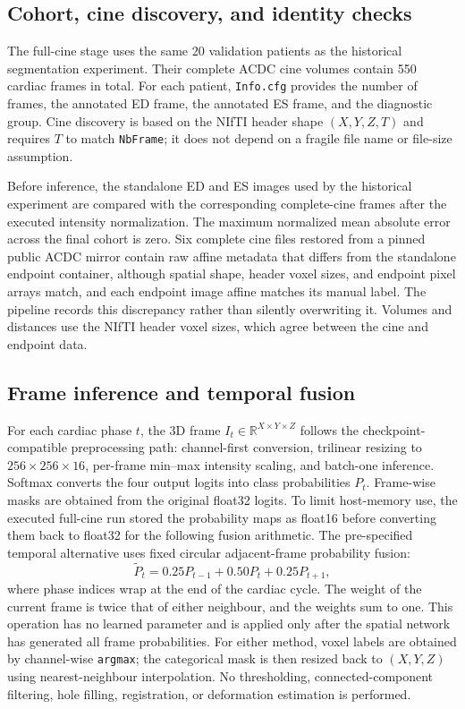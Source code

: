 \subsection{Cohort, cine discovery, and identity checks}
The full-cine stage uses the same 20 validation patients as the historical segmentation experiment. Their complete ACDC cine volumes contain 550 cardiac frames in total. For each patient, \texttt{Info.cfg} provides the number of frames, the annotated ED frame, the annotated ES frame, and the diagnostic group. Cine discovery is based on the NIfTI header shape $(X,Y,Z,T)$ and requires $T$ to match \texttt{NbFrame}; it does not depend on a fragile file name or file-size assumption.

Before inference, the standalone ED and ES images used by the historical experiment are compared with the corresponding complete-cine frames after the executed intensity normalization. The maximum normalized mean absolute error across the final cohort is zero. Six complete cine files restored from a pinned public ACDC mirror contain raw affine metadata that differs from the standalone endpoint container, although spatial shape, header voxel sizes, and endpoint pixel arrays match, and each endpoint image affine matches its manual label. The pipeline records this discrepancy rather than silently overwriting it. Volumes and distances use the NIfTI header voxel sizes, which agree between the cine and endpoint data.

\subsection{Frame inference and temporal fusion}
For each cardiac phase $t$, the 3D frame $I_t\in\mathbb{R}^{X\times Y\times Z}$ follows the checkpoint-compatible preprocessing path: channel-first conversion, trilinear resizing to $256\times256\times16$, per-frame min--max intensity scaling, and batch-one inference. Softmax converts the four output logits into class probabilities $P_t$. Frame-wise masks are obtained from the original float32 logits. To limit host-memory use, the executed full-cine run stored the probability maps as float16 before converting them back to float32 for the following fusion arithmetic. The pre-specified temporal alternative uses fixed circular adjacent-frame probability fusion:
\begin{equation}
    \widetilde{P}_t=0.25P_{t-1}+0.50P_t+0.25P_{t+1},
\end{equation}
where phase indices wrap at the end of the cardiac cycle. The weight of the current frame is twice that of either neighbour, and the weights sum to one. This operation has no learned parameter and is applied only after the spatial network has generated all frame probabilities. For either method, voxel labels are obtained by channel-wise \texttt{argmax}; the categorical mask is then resized back to $(X,Y,Z)$ using nearest-neighbour interpolation. No thresholding, connected-component filtering, hole filling, registration, or deformation estimation is performed.

